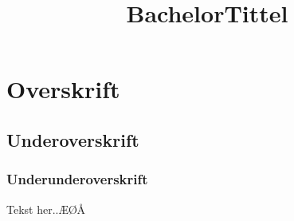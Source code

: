 \documentclass[a4paper,norsk,11pt]{article} %
\title{BachelorTittel}
\author{}
\begin{document}
\maketitle

\newpage

\tableofcontents

\newpage

\section{Overskrift}
\subsection{Underoverskrift}
\subsubsection{Underunderoverskrift}
Tekst her..ÆØÅ
\end{document}
